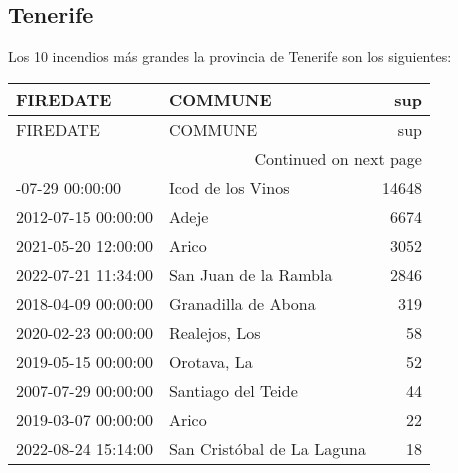 \documentclass[spanish]{article}
\begin{document}
\subsection{Tenerife}
Los 10 incendios más grandes la provincia de Tenerife son los siguientes:
\begin{longtable}{llr}
\toprule
FIREDATE & COMMUNE & sup \\
\midrule
\endfirsthead
\toprule
FIREDATE & COMMUNE & sup \\
\midrule
\endhead
\midrule
\multicolumn{3}{r}{Continued on next page} \\
\midrule
\endfoot
\bottomrule
\endlastfoot
2007-07-29 00:00:00 & Icod de los Vinos & 14648 \\
2012-07-15 00:00:00 & Adeje & 6674 \\
2021-05-20 12:00:00 & Arico & 3052 \\
2022-07-21 11:34:00 & San Juan de la Rambla & 2846 \\
2018-04-09 00:00:00 & Granadilla de Abona & 319 \\
2020-02-23 00:00:00 & Realejos, Los & 58 \\
2019-05-15 00:00:00 & Orotava, La & 52 \\
2007-07-29 00:00:00 & Santiago del Teide & 44 \\
2019-03-07 00:00:00 & Arico & 22 \\
2022-08-24 15:14:00 & San Cristóbal de La Laguna & 18 \\
\end{longtable}
\end{document}
